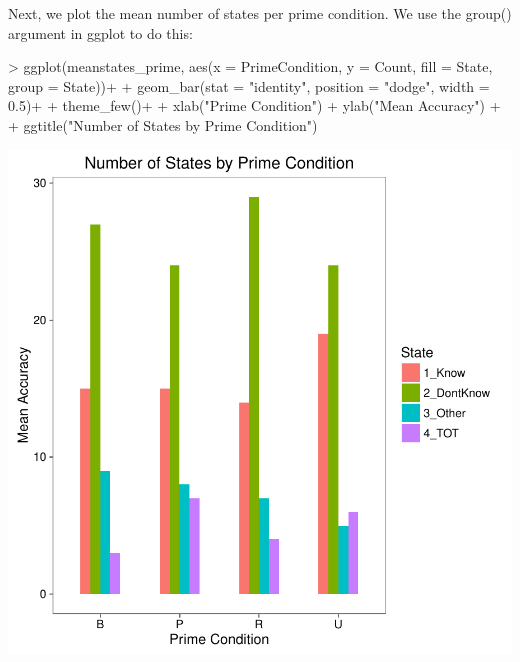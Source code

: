\documentclass[a4paper]{article}
\begin{document}
Next, we plot the mean number of states per prime condition. We use the group() argument in ggplot to do this:

\begin{Schunk}
\begin{Sinput}
> ggplot(meanstates_prime, aes(x = PrimeCondition, y = Count, fill = State, group = State))+
+  geom_bar(stat = "identity", position = "dodge", width = 0.5)+
+  theme_few()+
+   xlab("Prime Condition") + ylab("Mean Accuracy") + 
+   ggtitle("Number of States by Prime Condition")
\end{Sinput}
\end{Schunk}
\includegraphics{PrimeWithoutRetrieval_Analysis-005}







\end{document}
